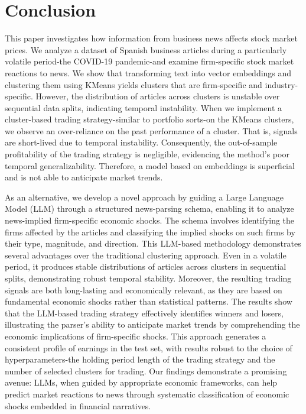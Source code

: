 \section{Conclusion}
This paper investigates how information from business news affects stock market prices. We analyze a dataset of Spanish business articles during a particularly volatile period-the COVID-19 pandemic-and examine firm-specific stock market reactions to news. We show that transforming text into vector embeddings and clustering them using KMeans yields clusters that are firm-specific and industry-specific. However, the distribution of articles across clusters is unstable over sequential data splits, indicating temporal instability. When we implement a cluster-based trading strategy-similar to portfolio sorts-on the KMeans clusters, we observe an over-reliance on the past performance of a cluster. That is, signals are short-lived due to temporal instability. Consequently, the out-of-sample profitability of the trading strategy is negligible, evidencing the method's poor temporal generalizability. Therefore, a model based on embeddings is superficial and is not able to anticipate market trends.

As an alternative, we develop a novel approach by guiding a Large Language Model (LLM) through a structured news-parsing schema, enabling it to analyze news-implied firm-specific economic shocks. The schema involves identifying the firms affected by the articles and classifying the implied shocks on such firms by their type, magnitude, and direction. This LLM-based methodology demonstrates several advantages over the traditional clustering approach. Even in a volatile period, it produces stable distributions of articles across clusters in sequential splits, demonstrating robust temporal stability. Moreover, the resulting trading signals are both long-lasting and economically relevant, as they are based on fundamental economic shocks rather than statistical patterns. The results show that the LLM-based trading strategy effectively identifies winners and losers, illustrating the parser's ability to anticipate market trends by comprehending the economic implications of firm-specific shocks. This approach generates a consistent profile of earnings in the test set, with results robust to the choice of hyperparameters-the holding period length of the trading strategy and the number of selected clusters for trading. Our findings demonstrate a promising avenue: LLMs, when guided by appropriate economic frameworks, can help predict market reactions to news through systematic classification of economic shocks embedded in financial narratives.
